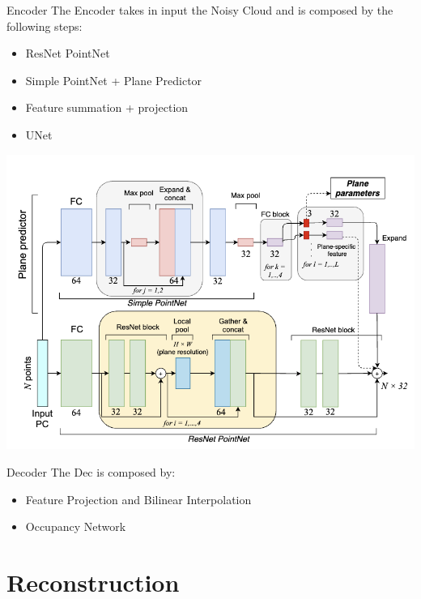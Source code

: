 \documentclass{beamer}
\begin{document}
\begin{frame}{Encoder}
The Encoder takes in input the Noisy Cloud and is composed by the following steps:
\begin{itemize}
\item ResNet PointNet
\item Simple PointNet + Plane Predictor 
\item Feature summation + projection 
\item UNet
\end{itemize}
\includegraphics[width=\textwidth]{../media/encoder.png}
\end{frame}

\begin{frame}{Decoder}
The Dec is composed by:
\begin{itemize}
\item Feature Projection and Bilinear Interpolation
\item Occupancy Network
\end{itemize}
\end{frame}

\section{Reconstruction}
\end{document}
